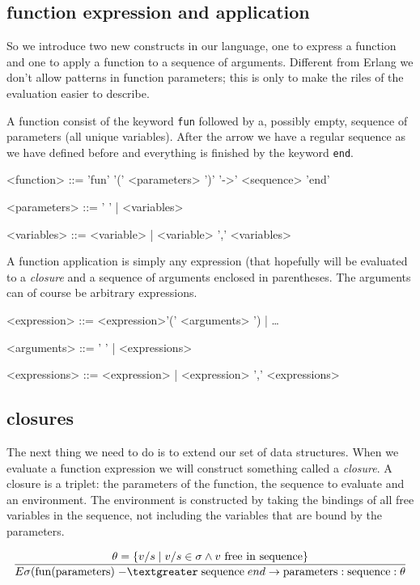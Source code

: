 \documentclass[a4paper,11pt]{article}
\begin{document}
\subsection{function expression and application}

So we introduce two new constructs in our language, one to express a
function and one to apply a function to a sequence of
arguments. Different from Erlang we don't allow patterns in function
parameters; this is only to make the riles of the evaluation easier to
describe.

A function consist of the keyword {\tt fun} followed by a, possibly
empty, sequence of parameters (all unique variables). After the arrow
we have a regular sequence as we have defined before and everything is
finished by the keyword {\tt end}.

\begin{grammar}
<function> ::= 'fun' '(' <parameters> ')' '-\textgreater' <sequence> 'end'

<parameters> ::= ' ' | <variables> 

<variables> ::= <variable> |  <variable> ',' <variables>
\end{grammar}

A function application is simply any expression (that hopefully will
be evaluated to a {\em closure} and a sequence of arguments enclosed
in parentheses. The arguments can of course be arbitrary expressions.

\begin{grammar}
<expression> ::=  <expression>'(' <arguments> ') | \ldots 

<arguments> ::= '  ' | <expressions> 

<expressions> ::= <expression> | <expression> ',' <expressions>
\end{grammar}

\subsection{closures}

The next thing we need to do is to extend our set of data
structures. When we evaluate a function expression we will construct
something called a {\em closure}. A closure is a triplet: the parameters
of the function, the sequence to evaluate and an environment. The
environment is constructed by taking the bindings of all free
variables in the sequence, not including the variables that are bound
by the parameters.

$$\frac{ \theta = \{ v/s \mid  v/s \in \sigma \wedge v {\rm\ free\  in\ sequence}\}}{
E\sigma({\rm fun}({\rm parameters})\; {\rm -\textgreater}\; {\rm sequence}\; end \rightarrow  {\rm parameters}:{\rm sequence}:\theta}$$
\end{document}
